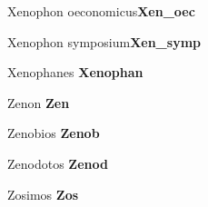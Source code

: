 \begin{footnotesize}
\begin{description}[%
				style=nextline,
				leftmargin=2cm,
				font=\normalfont]
\item[Xen. oec.] Xenophon oeconomicus\newline \textbf{Xen\_oec}
\item[Xen. symp.] Xenophon symposium\newline \textbf{Xen\_symp}
\item[Xenophan.] Xenophanes \newline \textbf{Xenophan}
\item[Zen.] Zenon \newline \textbf{Zen}
\item[Zenob.] Zenobios \newline \textbf{Zenob}
\item[Zenod.] Zenodotos \newline \textbf{Zenod}
\item[Zos.] Zosimos \newline \textbf{Zos}

\end{description}
\end{footnotesize}
